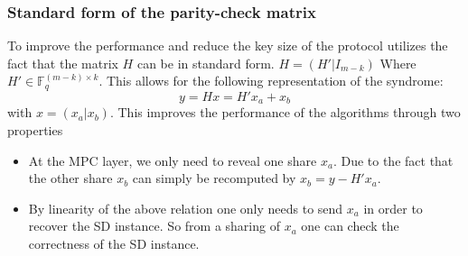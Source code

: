 \documentclass[twoside,11pt,openright]{report}
\theoremstyle{definition}
\theoremstyle{plain}
\begin{document}
\subsubsection{Standard form of the parity-check matrix}
\label{sec:standard_form_of_the_parity_check_matrix}
To improve the performance and reduce the key size of the protocol utilizes the fact that the matrix $H$ can be in standard form. $H = (H'|I_{m-k}) $ Where $H' \in \mathbb{F}^{(m-k)\times k}_q$. This allows for the following representation of the syndrome:
\begin{equation}
  y = Hx = H'x_a + x_b
  \label{eq:standard_form_of_the_parity_check_matrix}
\end{equation}
with $x = (x_a | x_b)$. This improves the performance of the algorithms through two properties
\begin{itemize}
  \item At the MPC layer, we only need to reveal one share $x_a$. Due to the fact that the other share $x_b$ can simply be recomputed by $x_b = y - H'x_a$.
  \item By linearity of the above relation one only needs to send $x_a$ in order to recover the SD instance. So from a sharing of $x_a$ one can check the correctness of the SD instance.
\end{itemize}
\end{document}
